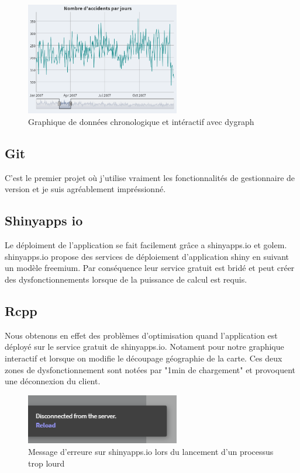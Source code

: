 \documentclass[a4paper, twoside]{article}
\begin{document}
\begin{figure}[h]
\caption{Graphique de données chronologique et intéractif avec dygraph}
\centering
\includegraphics[width=0.6\textwidth]{dygraph}
\end{figure}
\newpage
\subsection{Git}
C'est le premier projet où j'utilise vraiment les fonctionnalités de 
gestionnaire de version et je suis agréablement impréssionné.


\subsection{Shinyapps io}
Le déploiment de l'application se fait facilement grâce a shinyapps.io et golem.  
shinyapps.io propose des services de déploiement d'application shiny en suivant 
un modèle freemium. Par conséquence leur service gratuit est bridé et peut 
créer des dysfonctionnements lorsque de la puissance de calcul est requis.


\subsection{Rcpp}
Nous obtenons en effet des problèmes d'optimisation quand l'application est 
déployé sur le service gratuit de shinyapps.io. Notament pour notre graphique 
interactif et lorsque on modifie le découpage géographie de la carte. Ces deux 
zones de dysfonctionnement sont notées par "1min de chargement" et provoquent 
une déconnexion du client. 

\begin{figure}[h]
\caption{Message d'erreure sur shinyapps.io lors du lancement d'un processus trop lourd}
\centering
\includegraphics[width=0.6\textwidth]{erreurServer}
\end{figure}
\end{document}
